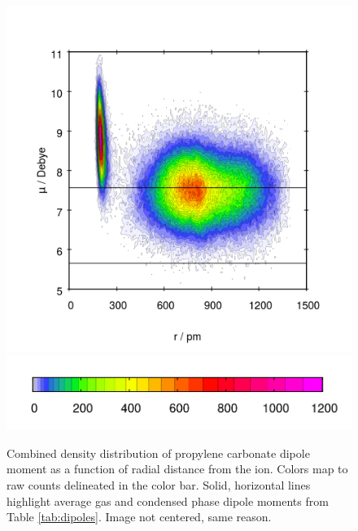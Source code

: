 \begin{ecpc}
\begin{figure}
 \begin{center}
 \includegraphics[width=0.98\linewidth]{images/ecpc/cdf_2_rdf_dipoleC4H6O3.png} \\
 \includegraphics[width=0.5\linewidth]{images/ecpc/cdf_2_rdf_dipoleC4H6O3_box.png}
 \end{center} 
 \caption[Propylene carbonate dipoles versus distance from ion]{\label{fig:pc_cdf}Combined density distribution of propylene
 carbonate dipole moment as a function of radial
 distance from the ion. Colors map to raw counts delineated in the color bar. Solid, horizontal lines highlight average
 gas and condensed phase dipole moments from Table \ref{tab:dipoles}. Image not centered, same reason.}
\end{figure}


\end{ecpc}

